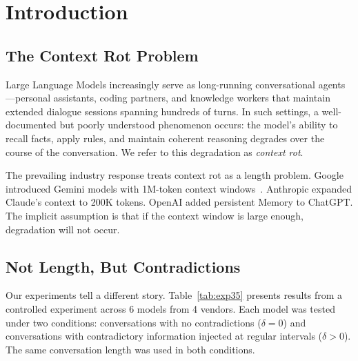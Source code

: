 \documentclass[11pt,a4paper]{article}
\begin{document}
\section{Introduction}
\label{sec:intro}

\subsection{The Context Rot Problem}

Large Language Models increasingly serve as long-running conversational agents---personal assistants, coding partners, and knowledge workers that maintain extended dialogue sessions spanning hundreds of turns.
In such settings, a well-documented but poorly understood phenomenon occurs: the model's ability to recall facts, apply rules, and maintain coherent reasoning degrades over the course of the conversation.
We refer to this degradation as \emph{context rot}.

The prevailing industry response treats context rot as a length problem.
Google introduced Gemini models with 1M-token context windows~\citep{gemini2025}.
Anthropic expanded Claude's context to 200K tokens.
OpenAI added persistent Memory to ChatGPT.
The implicit assumption is that if the context window is large enough, degradation will not occur.

\subsection{Not Length, But Contradictions}

Our experiments tell a different story.
Table~\ref{tab:exp35} presents results from a controlled experiment across 6 models from 4 vendors.
Each model was tested under two conditions: conversations with no contradictions ($\delta = 0$) and conversations with contradictory information injected at regular intervals ($\delta > 0$).
The same conversation length was used in both conditions.
\end{document}
